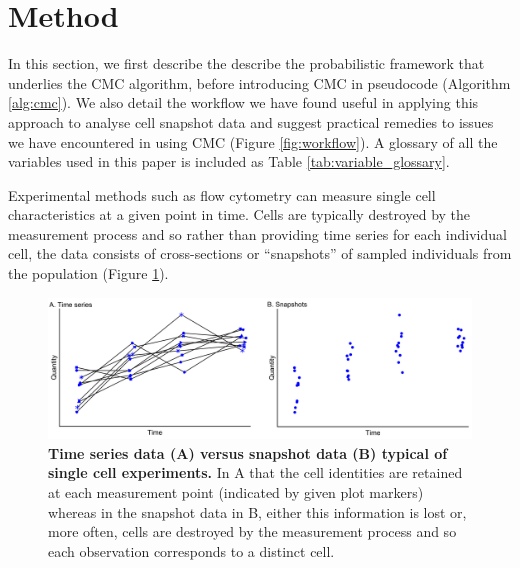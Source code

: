 \section{Method}\label{sec:method}
In this section, we first describe the describe the probabilistic framework that underlies the CMC algorithm, before introducing CMC in pseudocode (Algorithm \ref{alg:cmc}). We also detail the workflow we have found useful in applying this approach to analyse cell snapshot data and suggest practical remedies to issues we have encountered in using CMC (Figure \ref{fig:workflow}). A glossary of all the variables used in this paper is included as Table \ref{tab:variable_glossary}.

Experimental methods such as flow cytometry can measure single cell characteristics at a given point in time. Cells are typically destroyed by the measurement process and so rather than providing time series for each individual cell, the data consists of cross-sections or ``snapshots'' of sampled individuals from the population (Figure \ref{fig:time_series_v_snapshots}).

\begin{figure}[H]
	\centerline{\includegraphics[width=\textwidth]{../figures/time_series_v_snapshots.pdf}}
	\caption{\textbf{Time series data (A) versus snapshot data (B) typical of single cell experiments.} In A that the cell identities are retained at each measurement point (indicated by given plot markers) whereas in the snapshot data in B, either this information is lost or, more often, cells are destroyed by the measurement process and so each observation corresponds to a distinct cell.}
	\label{fig:time_series_v_snapshots}
\end{figure}

